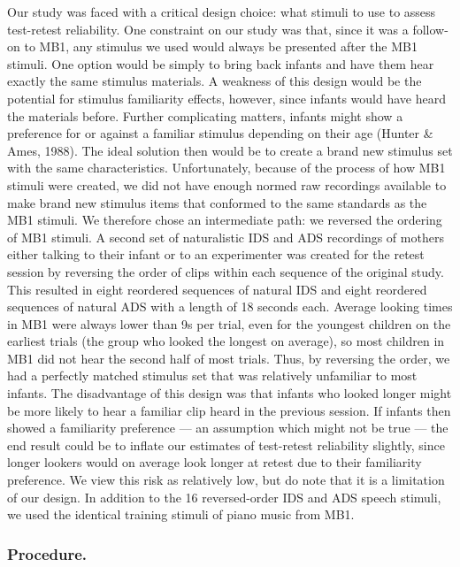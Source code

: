 \documentclass[
  man,floatsintext]{apa6}
\begin{document}
Our study was faced with a critical design choice: what stimuli to use to assess test-retest reliability.
One constraint on our study was that, since it was a follow-on to MB1, any stimulus we used would always be presented after the MB1 stimuli.
One option would be simply to bring back infants and have them hear exactly the same stimulus materials.
A weakness of this design would be the potential for stimulus familiarity effects, however, since infants would have heard the materials before.
Further complicating matters, infants might show a preference for or against a familiar stimulus depending on their age (Hunter \& Ames, 1988).
The ideal solution then would be to create a brand new stimulus set with the same characteristics.
Unfortunately, because of the process of how MB1 stimuli were created, we did not have enough normed raw recordings available to make brand new stimulus items that conformed to the same standards as the MB1 stimuli.
We therefore chose an intermediate path: we reversed the ordering of MB1 stimuli.
A second set of naturalistic IDS and ADS recordings of mothers either talking to their infant or to an experimenter was created for the retest session by reversing the order of clips within each sequence of the original study.
This resulted in eight reordered sequences of natural IDS and eight reordered sequences of natural ADS with a length of 18 seconds each.
Average looking times in MB1 were always lower than 9s per trial, even for the youngest children on the earliest trials (the group who looked the longest on average), so most children in MB1 did not hear the second half of most trials.
Thus, by reversing the order, we had a perfectly matched stimulus set that was relatively unfamiliar to most infants.
The disadvantage of this design was that infants who looked longer might be more likely to hear a familiar clip heard in the previous session.
If infants then showed a familiarity preference --- an assumption which might not be true --- the end result could be to inflate our estimates of test-retest reliability slightly, since longer lookers would on average look longer at retest due to their familiarity preference.
We view this risk as relatively low, but do note that it is a limitation of our design.
In addition to the 16 reversed-order IDS and ADS speech stimuli, we used the identical training stimuli of piano music from MB1.

\hypertarget{procedure.}{%
\subsubsection{Procedure.}\label{procedure.}}
\end{document}
